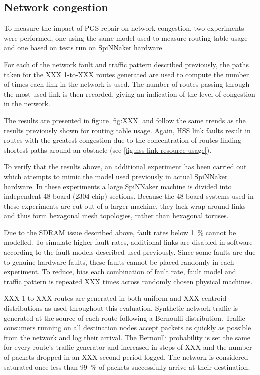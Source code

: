 		\subsection{Network congestion}
			
			To measure the impact of PGS repair on network congestion, two
			experiments were performed, one using the same model used to measure
			routing table usage and one based on tests run on SpiNNaker hardware.
			
			For each of the network fault and traffic pattern described previously,
			the paths taken for the XXX 1-to-XXX routes generated are used to compute
			the number of times each link in the network is used. The number of
			routes passing through the most-used link is then recorded, giving an
			indication of the level of congestion in the network.
			
			The results are presented in figure \ref{fig:XXX} and follow the same
			trends as the results previously shown for routing table usage. Again,
			HSS link faults result in routes with the greatest congestion due to the
			concentration of routes finding shortest paths around an obstacle (see
			\ref{fig:hss-link-resource-usage}).
			
			To verify that the results above, an additional experiment has been
			carried out which attempts to mimic the model used previously in actual
			SpiNNaker hardware. In these experiments a large SpiNNaker machine is
			divided into independent 48-board (2304-chip) sections. Because the
			48-board systems used in these experiments are cut out of a larger
			machine, they lack wrap-around links and thus form hexagonal mesh
			topologies, rather than hexagonal toruses.
			
			Due to the SDRAM issue described above, fault rates below
			\SI{1}{\percent} cannot be modelled.  To simulate higher fault rates,
			additional links are disabled in software according to the fault models
			described used previously. Since some faults are due to genuine hardware
			faults, these faults cannot be placed randomly in each experiment. To
			reduce, bias each combination of fault rate, fault model and traffic
			pattern is repeated XXX times across randomly chosen physical machines.
			
			XXX 1-to-XXX routes are generated in both uniform and XXX-centroid
			distributions as used throughout this evaluation. Synthetic network
			traffic is generated at the source of each route following a Bernoulli
			distribution. Traffic consumers running on all destination nodes accept
			packets as quickly as possible from the network and log their arrival.
			The Bernoulli probability is set the same for every route's traffic
			generator and increased in steps of XXX and the number of packets dropped
			in an XXX second period logged. The network is considered saturated once
			less than \SI{99}{\percent} of packets successfully arrive at their
			destination.
			
